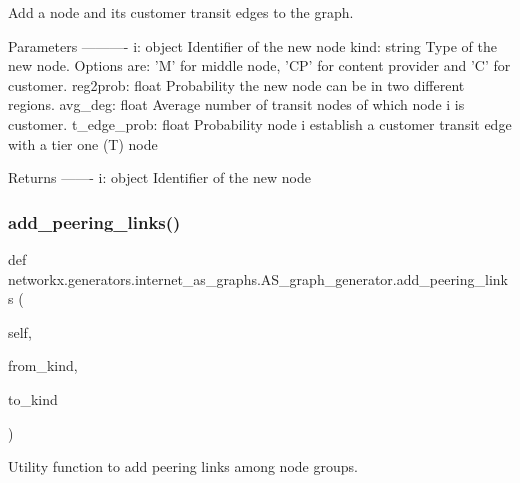 \begin{DoxyVerb}Add a node and its customer transit edges to the graph.

Parameters
----------
i: object
    Identifier of the new node
kind: string
    Type of the new node. Options are: 'M' for middle node, 'CP' for
    content provider and 'C' for customer.
reg2prob: float
    Probability the new node can be in two different regions.
avg_deg: float
    Average number of transit nodes of which node i is customer.
t_edge_prob: float
    Probability node i establish a customer transit edge with a tier
    one (T) node

Returns
-------
i: object
    Identifier of the new node
\end{DoxyVerb}
 \mbox{\label{classnetworkx_1_1generators_1_1internet__as__graphs_1_1AS__graph__generator_a393a6f9c3d26b783df0260002975de7e}} 
\subsubsection{\texorpdfstring{add\+\_\+peering\+\_\+links()}{add\_peering\_links()}}
{\footnotesize\ttfamily def networkx.\+generators.\+internet\+\_\+as\+\_\+graphs.\+A\+S\+\_\+graph\+\_\+generator.\+add\+\_\+peering\+\_\+links (\begin{DoxyParamCaption}\item[{}]{self,  }\item[{}]{from\+\_\+kind,  }\item[{}]{to\+\_\+kind }\end{DoxyParamCaption})}

\begin{DoxyVerb}Utility function to add peering links among node groups.\end{DoxyVerb}
 \mbox{\label{classnetworkx_1_1generators_1_1internet__as__graphs_1_1AS__graph__generator_a2dc9150cd108d2be3a61c5bb5f95f84b}} 
